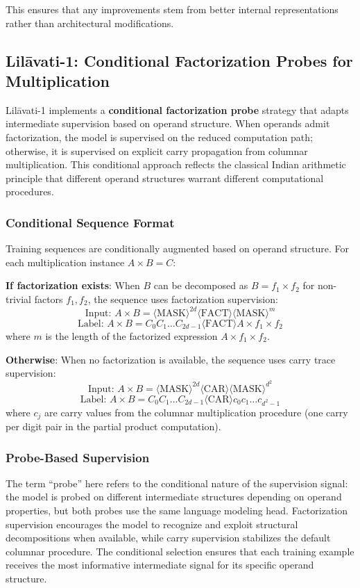 This ensures that any improvements stem from better internal representations rather than architectural modifications.

\subsection{Lil\={a}vati-1: Conditional Factorization Probes for Multiplication}
Lil\={a}vati-1 implements a \textbf{conditional factorization probe} strategy that adapts intermediate supervision based on operand structure. When operands admit factorization, the model is supervised on the reduced computation path; otherwise, it is supervised on explicit carry propagation from columnar multiplication. This conditional approach reflects the classical Indian arithmetic principle that different operand structures warrant different computational procedures.

\subsubsection{Conditional Sequence Format}
Training sequences are conditionally augmented based on operand structure. For each multiplication instance $A \times B = C$:

\textbf{If factorization exists}: When $B$ can be decomposed as $B = f_1 \times f_2$ for non-trivial factors $f_1, f_2$, the sequence uses factorization supervision:
\[
\text{Input: } A \times B = \langle \text{MASK} \rangle^{2d} \langle \text{FACT} \rangle \langle \text{MASK} \rangle^m
\]
\[
\text{Label: } A \times B = C_0 C_1 \ldots C_{2d-1} \langle \text{FACT} \rangle A \times f_1 \times f_2
\]
where $m$ is the length of the factorized expression $A \times f_1 \times f_2$.

\textbf{Otherwise}: When no factorization is available, the sequence uses carry trace supervision:
\[
\text{Input: } A \times B = \langle \text{MASK} \rangle^{2d} \langle \text{CAR} \rangle \langle \text{MASK} \rangle^{d^2}
\]
\[
\text{Label: } A \times B = C_0 C_1 \ldots C_{2d-1} \langle \text{CAR} \rangle c_0 c_1 \ldots c_{d^2-1}
\]
where $c_j$ are carry values from the columnar multiplication procedure (one carry per digit pair in the partial product computation).

\subsubsection{Probe-Based Supervision}
The term ``probe'' here refers to the conditional nature of the supervision signal: the model is probed on different intermediate structures depending on operand properties, but both probes use the same language modeling head. Factorization supervision encourages the model to recognize and exploit structural decompositions when available, while carry supervision stabilizes the default columnar procedure. The conditional selection ensures that each training example receives the most informative intermediate signal for its specific operand structure.

